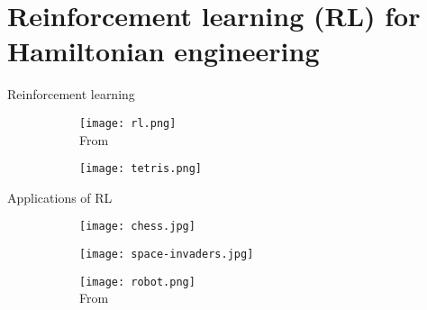\documentclass{beamer}
\begin{document}
\section{Reinforcement learning (RL) for Hamiltonian engineering}

\begin{frame}{Reinforcement learning}

\begin{figure}
\centering
\begin{subfigure}{.59\textwidth}
    \centering
    \texttt{[image: rl.png]} \\
    From \cite{sutton2018reinforcement}
\end{subfigure}
\begin{subfigure}{.39\textwidth}
    \centering
    \texttt{[image: tetris.png]}
\end{subfigure}
\end{figure}


\end{frame}


\begin{frame}{Applications of RL}
%


\begin{figure}
\centering
\begin{subfigure}{.54\textwidth}
    \centering
    \texttt{[image: chess.jpg]}
\end{subfigure}
\begin{subfigure}{.44\textwidth}
    \centering
    \texttt{[image: space-invaders.jpg]}
\end{subfigure}
\begin{subfigure}{.49\textwidth}
    \centering
    \texttt{[image: robot.png]} \\
    From \cite{gu2016deep}
\end{subfigure}

\end{figure}

\end{frame}


%
%
%
\end{document}
